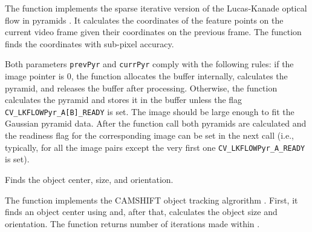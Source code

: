 The function implements the sparse iterative version of the Lucas-Kanade optical flow in pyramids
. It calculates the coordinates of the feature points on the current video
frame given their coordinates on the previous frame. The function finds
the coordinates with sub-pixel accuracy.

Both parameters \texttt{prevPyr} and \texttt{currPyr} comply with the
following rules: if the image pointer is 0, the function allocates the
buffer internally, calculates the pyramid, and releases the buffer after
processing. Otherwise, the function calculates the pyramid and stores
it in the buffer unless the flag \texttt{CV\_LKFLOWPyr\_A[B]\_READY}
is set. The image should be large enough to fit the Gaussian pyramid
data. After the function call both pyramids are calculated and the
readiness flag for the corresponding image can be set in the next call
(i.e., typically, for all the image pairs except the very first one
\texttt{CV\_LKFLOWPyr\_A\_READY} is set).


Finds the object center, size, and orientation.


\begin{description}
\ifC %
\else %
\fi %
\end{description}

The function implements the CAMSHIFT object tracking algrorithm
.
First, it finds an object center using  and, after that, calculates the object size and orientation. The function returns number of iterations made within .

